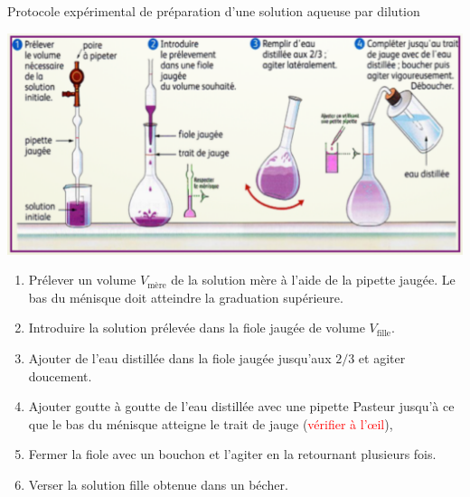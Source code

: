 \begin{doc}{Protocole expérimental de préparation d'une solution aqueuse par dilution}
\vspace{-0.8cm}
\begin{center}
    \includegraphics[scale=0.5]{Images/Protocole_dilution.png}
  \end{center}
  
  \begin{enumerate}
    \item Prélever un volume $V_\text{mère}$ de la solution mère à l'aide de la pipette jaugée.
    Le bas du ménisque doit atteindre la graduation supérieure.
    \item Introduire la solution prélevée dans la fiole jaugée de volume $V_\text{fille}$.
    \item Ajouter de l'eau distillée dans la fiole jaugée jusqu'aux $2/3$ et agiter doucement. 
    \item Ajouter goutte à goutte de l'eau distillée avec une pipette Pasteur jusqu'à ce que le bas du ménisque atteigne le trait de jauge (\textcolor{red}{vérifier à l'\oe il}),
    \item Fermer la fiole avec un bouchon et l'agiter en la retournant plusieurs fois.
    \item Verser la solution fille obtenue dans un bécher.
    \end{enumerate}
\end{doc}


